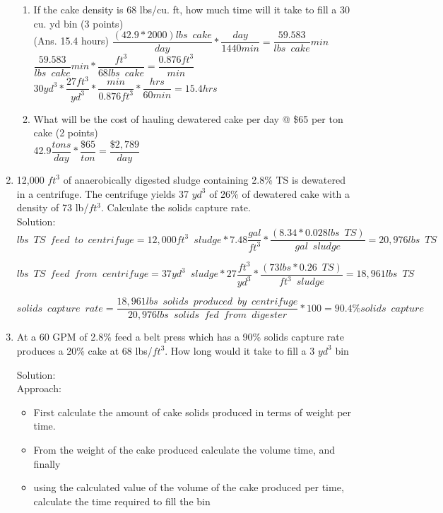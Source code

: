\begin{enumerate}
\begin{enumerate}
\item If the cake density is 68 lbs/cu. ft, how much time will it take to fill a 30 cu. yd bin (3 points)\\
(Ans. 15.4 hours)
$\dfrac{(42.9*2000)lbs \enspace cake}{day}*\dfrac{day}{1440 min}=\dfrac{59.583}{lbs \enspace cake}{min}$\\
$\dfrac{59.583}{lbs \enspace cake}{min}*\dfrac{ft^3}{68 lbs \enspace cake}=\dfrac{0.876ft^3}{min}$\\
$30yd^3*\dfrac{27ft^3}{yd^3}*\dfrac{min}{0.876ft^3}*\dfrac{hrs}{60 min}=\boxed{15.4hrs}$
\vspace{0.25cm}
\item What will be the cost of hauling dewatered cake per day @ \$65 per ton cake (2 points)\\
42.9$\dfrac{tons}{day}*\dfrac{\$65}{ton}=\boxed{\dfrac{\$2,789}{day}}$
\end{enumerate}

\item 12,000 $ft^3$ of anaerobically digested sludge containing 2.8\% TS is dewatered in a centrifuge.  The centrifuge yields 37 $yd^3$ of 26\% of dewatered cake with a density of 73 lb/$ft^3$.  Calculate the solids capture rate.\\


 

Solution:\\
{
$
	lbs \enspace TS \enspace feed \enspace to \enspace centrifuge
	=
	12,000 ft^3 \enspace sludge
	*
	7.48 
	\dfrac
	{
	gal
	}
	{
	ft^3
	}
	*
	\dfrac
	{
	(8.34*0.028 lbs \enspace TS )
	}
	{gal \enspace sludge
	}
	=20,976 {lbs \enspace TS}
$
}

{
$
	lbs \enspace TS \enspace feed \enspace from \enspace centrifuge
	=
	37 yd^3 \enspace sludge
	*
	27 
	\dfrac
	{
	ft^3
	}
	{
	yd^3
	}
	*
	\dfrac
	{
	(73 lbs *0.26 \enspace TS )
	}
	{ft^3 \enspace sludge
	}
	=18,961 {lbs \enspace TS}
$
}

{
$
	solids \enspace capture \enspace rate
	=
	\dfrac
	{
	18,961 lbs \enspace solids \enspace produced 		\enspace by \enspace centrifuge
	}
	{
	20,976 lbs \enspace solids \enspace fed 			\enspace from \enspace digester
	}
	*
	100 
	=\boxed
	{
	90.4\% solids \enspace capture
	}
$
}

\item At a 60 GPM of 2.8\% feed a belt press which has a 90\% solids capture rate produces a 20\% cake at 68 lbs/$ft^3$.  How long would it take to fill a 3 $yd^3$ bin  
	
	
Solution:\\
Approach:
\begin{itemize}
\item First calculate the amount of cake solids produced in terms of weight per time.
\item From the weight of the cake produced calculate the volume time, and finally
\item using the calculated value of the volume of the cake produced per time, calculate the time required to fill the bin\\
\end{itemize}


\end{enumerate}
